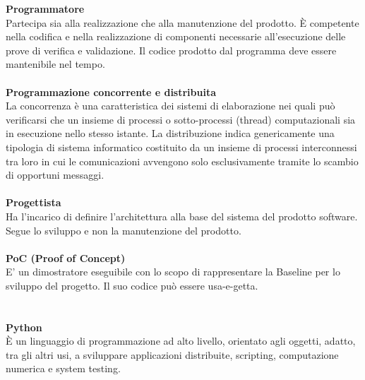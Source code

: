 \textbf{Programmatore}\\ 
Partecipa sia alla realizzazione che alla manutenzione del prodotto. È competente nella codifica e nella realizzazione di componenti necessarie all'esecuzione delle prove di verifica e validazione. Il codice prodotto dal programma deve essere mantenibile nel tempo.\\ \\
\textbf{Programmazione concorrente e distribuita}\\
La concorrenza è una caratteristica dei sistemi di elaborazione nei quali può verificarsi che un insieme di processi o sotto-processi (thread) computazionali sia in esecuzione nello stesso istante. La distribuzione indica genericamente una tipologia di sistema informatico costituito da un insieme di processi interconnessi tra loro in cui le comunicazioni avvengono solo esclusivamente tramite lo scambio di opportuni messaggi. \\ \\
\textbf{Progettista}\\ 
Ha l'incarico di definire l'architettura alla base del sistema del prodotto software. Segue lo sviluppo e non la manutenzione del prodotto. \\ \\
\textbf{PoC (Proof of Concept)}\\
E' un dimostratore eseguibile con lo scopo di rappresentare la Baseline per lo sviluppo del progetto. Il suo codice può essere usa-e-getta. \\ \\ \\ %
\textbf{Python}\\
È un linguaggio di programmazione ad alto livello, orientato agli oggetti, adatto, tra gli altri usi, a sviluppare applicazioni distribuite, scripting, computazione numerica e system testing. \\ \\
\clearpage